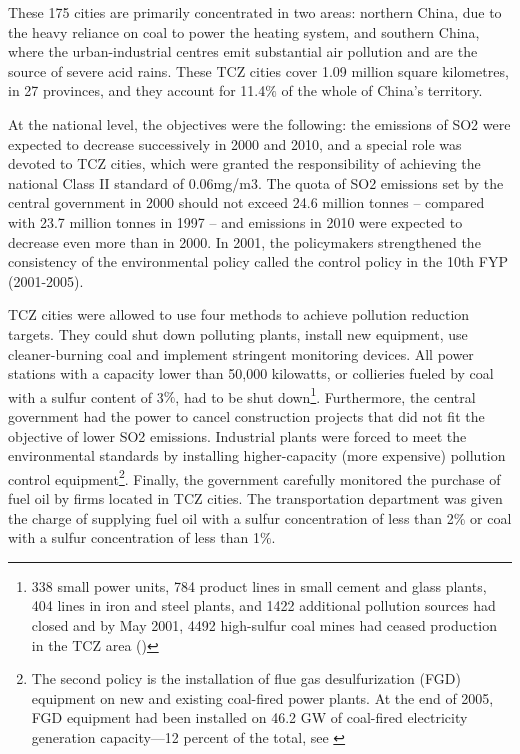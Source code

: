 \documentclass[12pt]{article}
\begin{document}
These 175 cities are primarily concentrated in two areas: northern China, due to the heavy reliance on coal to power the heating system, and southern China, where the urban-industrial centres emit substantial air pollution and are the source of severe acid rains. These TCZ cities cover 1.09 million square kilometres, in 27 provinces, and they account for 11.4$\%$ of the whole of China's territory.


At the national level, the objectives were the following: the emissions of SO2 were expected to decrease successively in 2000 and 2010, and a special role was devoted to TCZ cities, which were granted the responsibility of achieving the national Class II standard of 0.06mg/m3. The quota of SO2 emissions set by the central government in 2000 should not exceed 24.6 million tonnes – compared with 23.7 million tonnes in 1997 – and emissions in 2010 were expected to decrease even more than in 2000. In 2001, the policymakers strengthened the consistency of the environmental policy called the control policy in the 10th FYP (2001-2005). 


TCZ cities were allowed to use four methods to achieve pollution reduction targets. They could shut down polluting plants, install new equipment, use cleaner-burning coal and implement stringent monitoring devices. All power stations with a capacity lower than 50,000 kilowatts, or collieries fueled by coal with a sulfur content of 3$\%$, had to be shut down\footnote{ 338 small power units, 784 product lines in small cement and glass plants, 404 lines in iron and steel plants, and 1422 additional pollution sources had closed and by May 2001, 4492 high-sulfur coal mines had ceased production in the TCZ area (\cite{He2002-ga})}. Furthermore, the central government had the power to cancel construction projects that did not fit the objective of lower SO2 emissions. Industrial plants were forced to meet the environmental standards by installing higher-capacity (more expensive) pollution control equipment\footnote{ The second policy is the installation of flue gas desulfurization (FGD) equipment on new and existing coal-fired power plants. At the end of 2005, FGD equipment had been installed on 46.2 GW of coal-fired electricity generation capacity—12 percent of the total, see \cite{Cao2009-sv}}. Finally, the government carefully monitored the purchase of fuel oil by firms located in TCZ cities. The transportation department was given the charge of supplying fuel oil with a sulfur concentration of less than 2$\%$ or coal with a sulfur concentration of less than 1$\%$. 
\end{document}
